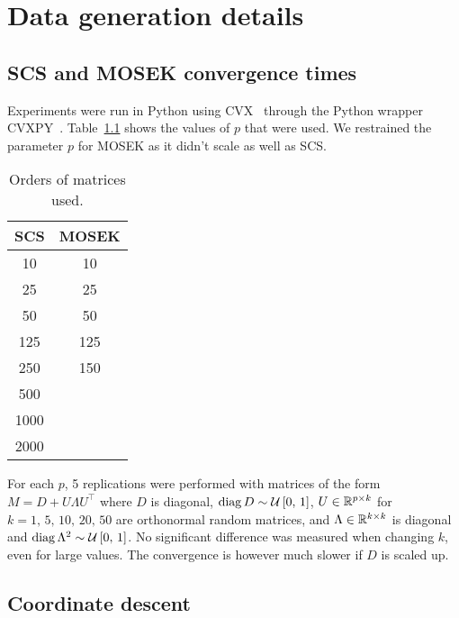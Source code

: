\appendix
\chapter{Data generation details}\label{ch:appendix_data}

\section{SCS and MOSEK convergence times}\label{sec:cvx_times}

Experiments were run in Python using CVX~\cite{cvx} through the Python wrapper CVXPY~\cite{cvxpy}.
Table~\ref{tab:cvx_times_ps} shows the values of $p$ that were used.
We restrained the parameter $p$ for MOSEK as it didn't scale as well as SCS\@.
\begin{table}[!htb]
    \centering
    \setlength{\tabcolsep}{2pt}
    {\small
    \begin{tabular}{|c|c|}\hline
    \textbf{SCS} & \textbf{MOSEK}\\ \hline
        10 & 10\\ \hline
        25 & 25\\ \hline
        50 & 50\\ \hline
        125 & 125\\ \hline
        250 & 150\\ \hline
        500 &\\ \hline
        1000 &\\ \hline
        2000 &\\ \hline
    \end{tabular}
    }%
    \caption[short]{
        Orders of matrices used.
    }
    \label{tab:cvx_times_ps}
\end{table}
For each $p$, 5 replications were performed with matrices of the form $M = D + U \Lambda U^\top$ where $D$ is diagonal,
$\operatorname*{diag} D \sim \mathcal{U}\left[ 0,\, 1 \right]$, $U \in \mathbb{R}^{p \times k}$ for $k = 1,\, 5,\, 10,\, 20,\, 50$
are orthonormal random matrices, and $\Lambda \in \mathbb{R}^{k \times k}$ is diagonal and
$\operatorname*{diag} \Lambda^2 \sim \mathcal{U}\left[ 0,\, 1 \right]$.
No significant difference was measured when changing $k$, even for large values.
The convergence is however much slower if $D$ is scaled up.

\section{Coordinate descent}\label{sec:coordinate_descent_data}



